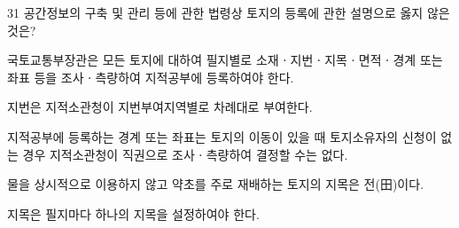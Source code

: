 \begin{question}{31}
공간정보의 구축 및 관리 등에 관한 법령상 토지의 등록에 관한 설명으로 옳지 않은 것은?
\begin{choices}
  \item 국토교통부장관은 모든 토지에 대하여 필지별로 소재ㆍ지번ㆍ지목ㆍ면적ㆍ경계 또는 좌표 등을 조사ㆍ측량하여 지적공부에 등록하여야 한다.
  \item 지번은 지적소관청이 지번부여지역별로 차례대로 부여한다.
  \item 지적공부에 등록하는 경계 또는 좌표는 토지의 이동이 있을 때 토지소유자의 신청이 없는 경우 지적소관청이 직권으로 조사ㆍ측량하여 결정할 수는 없다.
  \item 물을 상시적으로 이용하지 않고 약초를 주로 재배하는 토지의 지목은 전(田)이다.
  \item 지목은 필지마다 하나의 지목을 설정하여야 한다.
\end{choices}
\end{question}
